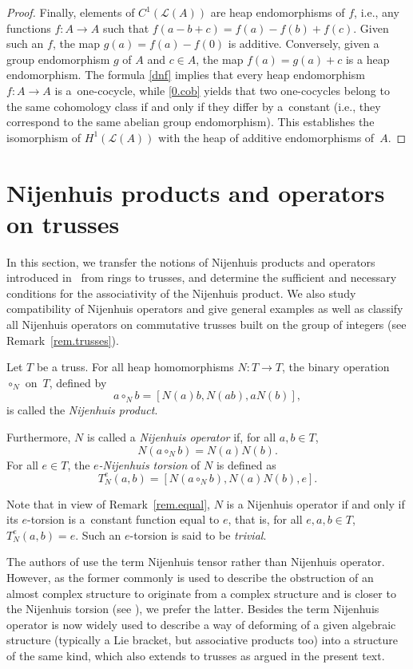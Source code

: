 \documentclass[pdftex]{sigma}
\numberwithin{equation}{section}
\begin{document}
\begin{proof}
 Finally, elements of $C^1(\mathcal{L}(A))$ are heap endomorphisms of $f$, i.e., any functions $f\colon A\to A$ such that $f(a-b+c) = f(a)-f(b) +f(c)$. Given such an $f$, the map $g(a) = f(a) -f(0)$ is additive. Conversely, given a group endomorphism $g$ of $A$ and $c\in A$, the map $f(a) = g(a) +c$ is a heap endomorphism. The formula \eqref{dnf} implies that every heap endomorphism $f\colon A\to A$ is a~one-cocycle, while \eqref{0.cob} yields that two one-cocycles belong to the same cohomology class if and only if they differ by a~constant (i.e., they correspond to the same abelian group endomorphism). This establishes the isomorphism of $H^1(\mathcal{L}(A))$ with the heap of additive endomorphisms of~$A$.
\end{proof}

\section{Nijenhuis products and operators on trusses}\label{section4}

In this section, we transfer the notions of Nijenhuis products and operators introduced in~\cite{4} from rings to trusses, and determine the sufficient and necessary conditions for the associativity of the Nijenhuis product. We also study compatibility of Nijenhuis operators and give general examples as well as classify all Nijenhuis operators on commutative trusses built on the group of integers (see Remark~\ref{rem.trusses}).
\begin{Definition}\label{def.Nij.tor}
Let $T$ be a truss. For all heap homomorphisms $N\colon T \rightarrow T$, the binary operation~$\circ_{N}$ on~$T$, defined by
\[a \circ_{N} b = [N(a)b, N(ab), aN(b)],\]
is called the \textit{Nijenhuis product}.

Furthermore, $N$ is called a
\textit{Nijenhuis operator} if, for all $a,b \in T$,
\[N(a \circ_{N} b) = N(a)N(b).\]
For all $e \in T$, the \textit{$e$-Nijenhuis torsion} of $N$ is defined as
\[T^{e}_{N}(a,b) = [N(a \circ_{N} b),N(a)N(b),e].\]
\end{Definition}

Note that in view of Remark~\ref{rem.equal}, $N$ is a Nijenhuis operator if and only if its $e$-torsion is a~constant function equal to $e$, that is, for all $e,a,b\in T$, $T^{e}_{N}(a,b)=e$. Such an $e$-torsion is said to be \textit{trivial}.

\begin{Remark}
 The authors of \cite{4} use the term Nijenhuis tensor rather than Nijenhuis operator. However, as the former commonly is used to describe the obstruction of an almost complex structure to originate from a complex structure and is closer to the Nijenhuis torsion (see \cite[footnote~1, p.~627]{Kos:Nij}), we prefer the latter. Besides the term Nijenhuis operator is now widely used to describe a way of deforming of a given algebraic structure (typically a Lie bracket, but associative products too) into a structure of the same kind, which also extends to trusses as argued in the present text.
\end{Remark}
\end{document}
